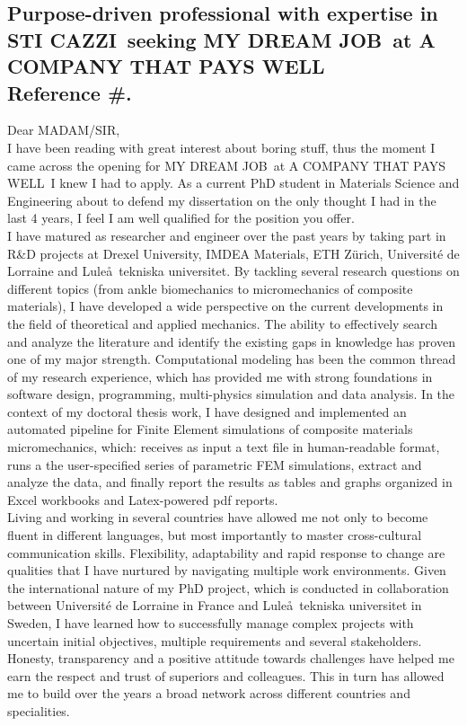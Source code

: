 \documentclass[
  a4paper, 
]{fortysecondscv}
\def\expertise{STI CAZZI}
\def\position{MY DREAM JOB}
\def\company{A COMPANY THAT PAYS WELL}
\def\reference{\\[6pt] Reference \#}
\def\salutation{MADAM/SIR}
\def\readinginterest{boring stuff}
\def\dissertationtopic{the only thought I had in the last 4 years}
\begin{document}
\makefrontsidebar

\cvsignature
\vspace*{12pt}
\subsection{\textbf{Purpose-driven professional with expertise in \expertise\ seeking \position\ at \company\reference.}}
\vspace*{12pt}
Dear \salutation,\\[6pt]
I have been reading with great interest about \readinginterest, thus the moment I came across the opening for \position\ at \company\ I knew I had to apply. As a current PhD student in Materials Science and Engineering about to defend my dissertation on \dissertationtopic, I feel I am well qualified for the position you offer.\\[6pt]
I have matured as researcher and engineer over the past years by taking part in R\&D projects at Drexel University, IMDEA Materials, ETH Z\"urich, Universit\'e de Lorraine and Lule\aa\ tekniska universitet. By tackling several research questions on different topics (from ankle biomechanics to micromechanics of composite materials), I have developed a wide perspective on the current developments in the field of theoretical and applied mechanics. The ability to effectively search and analyze the literature and identify the existing gaps in knowledge has proven one of my major strength. Computational modeling has been the common thread of my research experience, which has provided me with strong foundations in software design, programming, multi-physics simulation and data analysis. In the context of my doctoral thesis work, I have designed and implemented an automated pipeline for Finite Element simulations of composite materials micromechanics, which: receives as input a text file in human-readable format, runs a the user-specified series of parametric FEM simulations, extract and analyze the data, and finally report the results as tables and graphs organized in Excel workbooks and Latex-powered pdf reports.\\[6pt]
Living and working in several countries have allowed me not only to become fluent in different languages, but most importantly to master cross-cultural communication skills. Flexibility, adaptability and rapid response to change are qualities that I have nurtured by navigating multiple work environments. Given the international nature of my PhD project, which is conducted in collaboration between Universit\'e de Lorraine in France and Lule\aa\ tekniska universitet in Sweden, I have learned how to successfully manage complex projects with uncertain initial objectives, multiple requirements and several stakeholders. Honesty, transparency and a positive attitude towards challenges have helped me earn the respect and trust of superiors and colleagues. This in turn has allowed me to build over the years a broad network across different countries and specialities.\\[6pt]
\end{document}
